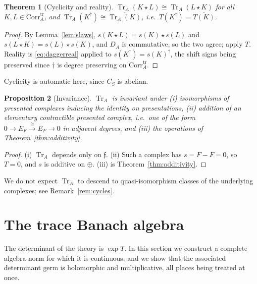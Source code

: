 \documentclass[11pt]{amsart}
\newtheorem{theorem}{Theorem}[section]
\newtheorem{proposition}[theorem]{Proposition}
\theoremstyle{definition}
\theoremstyle{remark}
\newcommand{\Tr}{\operatorname{Tr}}
\newcommand{\DA}{D_A}
\newcommand{\Corrtr}{\mathrm{Corr}^{\mathrm{tr}}_{A}}
\begin{document}
\begin{theorem}[Cyclicity and reality]\label{thm:cyclic}
$\Tr_A(K\star L)\cong\Tr_A(L\star K)$ for all $K,L\in\Corrtr$, and
$\Tr_A(K^{\dagger})\cong\overline{\Tr_A(K)}$, i.e.\
$T(K^{\dagger})=\overline{T(K)}$.
\end{theorem}

\begin{proof}
By Lemma~\ref{lem:slaws}, $s(K\star L)=s(K)\star s(L)$ and $s(L\star
K)=s(L)\star s(K)$, and $\DA$ is commutative, so the two agree; apply $T$.
Reality is \eqref{eq:daggerreal} applied to $s(K^{\dagger})=s(K)^{\dagger}$,
the shift signs being preserved since $\dagger$ is degree preserving on
$\Corrtr$.
\end{proof}

Cyclicity is automatic here, since $C_S$ is abelian.

\begin{proposition}[Invariance]\label{prop:invariance}
$\Tr_A$ is invariant under (i) isomorphisms of presented complexes inducing the
identity on presentations, (ii) addition of an elementary contractible presented
complex, i.e.\ one of the form $0\to E_F\xrightarrow{\ \cong\ }E_F\to0$ in
adjacent degrees, and (iii) the operations of Theorem~\ref{thm:additivity}.
\end{proposition}

\begin{proof}
(i) $\Tr_A$ depends only on $\mathfrak f$.  (ii) Such a complex has
$s=F-F=0$, so $T=0$, and $s$ is additive on $\oplus$.  (iii) is
Theorem~\ref{thm:additivity}.
\end{proof}

We do not expect $\Tr_A$ to descend to quasi-isomorphism classes of the
underlying complexes; see Remark~\ref{rem:cycles}.

\section{The trace Banach algebra}\label{sec:banach}

The determinant of the theory is $\exp T$.  In this section we construct a
complete algebra norm for which it is continuous, and we show that the
associated determinant germ is holomorphic and multiplicative, all places
being treated at once.
\end{document}
